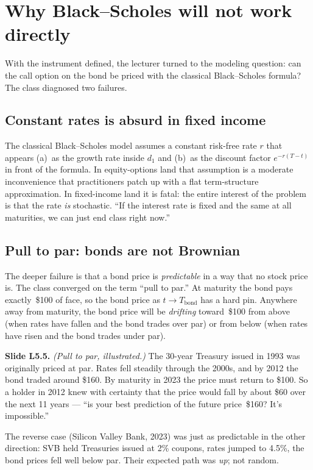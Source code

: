 \section{Why Black--Scholes will not work directly}\label{L5-sec:bs-fails}

With the instrument defined, the lecturer turned to the modeling
question: can the call option on the bond be priced with the
classical Black--Scholes formula? The class diagnosed two failures.

\subsection{Constant rates is absurd in fixed income}\label{L5-sec:bs-fail-1}

The classical Black--Scholes model assumes a constant risk-free rate
$r$ that appears (a)~as the growth rate inside $d_1$ and (b)~as the
discount factor $e^{-r(T-t)}$ in front of the formula. In equity-options
land that assumption is a moderate inconvenience that practitioners
patch up with a flat term-structure approximation. In fixed-income
land it is fatal: the entire interest of the problem is that the rate
\emph{is} stochastic. ``If the interest rate is fixed and the same at
all maturities, we can just end class right now.''

\subsection{Pull to par: bonds are not Brownian}\label{L5-sec:bs-fail-2}

The deeper failure is that a bond price is \emph{predictable} in a
way that no stock price is. The class converged on the term ``pull to
par.'' At maturity the bond pays exactly~\$100 of face, so the bond
price as $t \to T_{\text{bond}}$ has a hard pin. Anywhere away from
maturity, the bond price will be \emph{drifting} toward~\$100 from
above (when rates have fallen and the bond trades over par) or from
below (when rates have risen and the bond trades under par).

\begin{keyblock}
\textbf{Slide L5.5.} \emph{(Pull to par, illustrated.)} The 30-year
Treasury issued in 1993 was originally priced at par. Rates fell
steadily through the 2000s, and by 2012 the bond traded around
\$160. By maturity in 2023 the price must return to \$100. So a
holder in 2012 knew with certainty that the price would fall by about
\$60 over the next 11 years --- ``is your best prediction of the future
price~\$160? It's impossible.''

The reverse case (Silicon Valley Bank, 2023) was just as predictable
in the other direction: SVB held Treasuries issued at 2\% coupons,
rates jumped to 4.5\%, the bond prices fell well below par. Their
expected path was \emph{up}; not random.
\end{keyblock}

